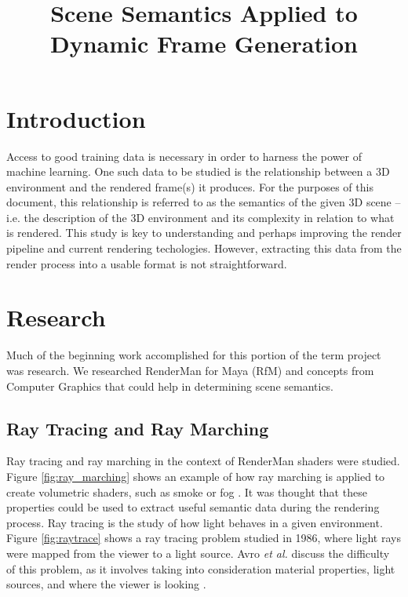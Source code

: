 \documentclass[conference]{IEEEtran}
\begin{document}
\title{Scene Semantics Applied to \\ Dynamic Frame Generation}

\author{
}

\maketitle

\begin{abstract}
\end{abstract}

\section{Introduction}
\label{sec:introduction}
Access to good training data is necessary
in order to harness the power of machine learning.
One such data to be studied is the relationship
between a 3D environment and the
rendered frame(s) it produces.
For the purposes of this document, this relationship is
referred to as the semantics of the given 3D scene --
i.e. the description of the 3D environment and its complexity
in relation to what is rendered.
This study is key to understanding and perhaps improving the
render pipeline and current rendering techologies.
However, extracting this data from the render process into a usable
format is not straightforward.

\section{Research}
Much of the beginning work accomplished for this portion of the term project was research.
We researched RenderMan for Maya (RfM) and concepts from Computer Graphics
that could help in determining scene semantics.

\subsection{Ray Tracing and Ray Marching}
Ray tracing and ray marching in the context of RenderMan shaders were studied.
Figure \ref{fig:ray_marching} shows an example of how ray marching is applied to
create volumetric shaders, such as smoke or fog \cite{ray_marching}.
It was thought that these properties could be used to extract useful semantic data
during the rendering process.
Ray tracing is the study of how light behaves in a given environment.
Figure \ref{fig:raytrace}
shows a ray tracing problem studied in 1986, where light rays were mapped from
the viewer to a light source. Avro \textit{et al.}
discuss the difficulty of this problem,
as it involves taking into consideration material properties, light sources,
and where the viewer is looking \cite{backwards_raytrace}.
\end{document}
